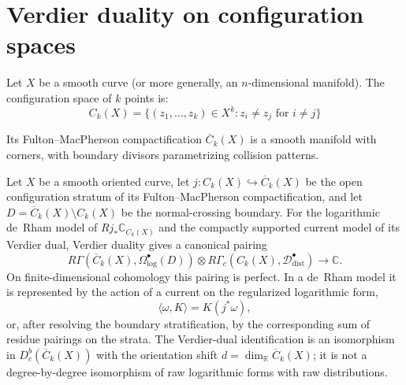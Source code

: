 \section{Verdier duality on configuration spaces}

\begin{setup}\label{setup:config-verdier}
Let $X$ be a smooth curve (or more generally, an $n$-dimensional manifold). The configuration space of $k$ points is:
\[C_k(X) = \{(z_1, \ldots, z_k) \in X^k : z_i \neq z_j \text{ for } i \neq j\}\]

Its Fulton--MacPherson compactification $\overline{C}_k(X)$ is a smooth manifold with corners, with boundary divisors parametrizing collision patterns.
\end{setup}

\begin{theorem}\label{thm:verdier-config}
Let $X$ be a smooth oriented curve, let
$j\colon C_k(X)\hookrightarrow \overline{C}_k(X)$ be the open
configuration stratum of its Fulton--MacPherson compactification,
and let $D=\overline{C}_k(X)\setminus C_k(X)$ be the normal-crossing
boundary. For the logarithmic de~Rham model of
$Rj_*\mathbb C_{C_k(X)}$ and the compactly supported current model
of its Verdier dual, Verdier duality gives a canonical pairing
\[
R\Gamma(\overline{C}_k(X),\Omega^\bullet_{\log}(D))
\otimes
R\Gamma_c(C_k(X),\mathcal{D}^\bullet_{\mathrm{dist}})
\longrightarrow \mathbb{C}.
\]
On finite-dimensional cohomology this pairing is perfect. In a
de~Rham model it is represented by the action of a current on the
regularized logarithmic form,
\[
\langle \omega, K \rangle = K(j^*\omega),
\]
or, after resolving the boundary stratification, by the corresponding
sum of residue pairings on the strata.
The Verdier-dual identification is an isomorphism in
$D^b_c(\overline{C}_k(X))$ with the orientation shift
$d=\dim_{\mathbb{R}}\overline{C}_k(X)$; it is not a
degree-by-degree isomorphism of raw logarithmic forms with raw
distributions.
\end{theorem}

